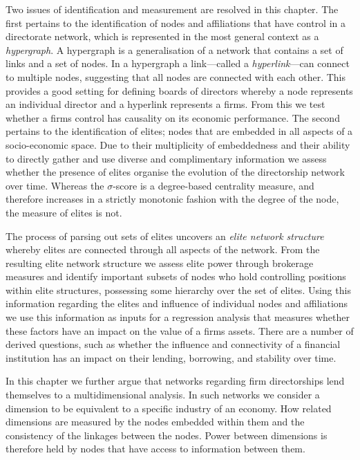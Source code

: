 Two issues of identification and measurement are resolved in this chapter. The first pertains to the identification of nodes and affiliations that have control in a directorate network, which is represented in the most general context as a \emph{hypergraph}. A hypergraph is a generalisation of a network that contains a set of links and a set of nodes. In a hypergraph a link---called a \emph{hyperlink}---can connect to multiple nodes, suggesting that all nodes are connected with each other. This provides a good setting for defining boards of directors whereby a node represents an individual director and a hyperlink represents a firms. From this we test whether a firms control has causality on its economic performance. The second pertains to the identification of elites; nodes that are embedded in all aspects of a socio-economic space. Due to their multiplicity of embeddedness and their ability to directly gather and use diverse and complimentary information we assess whether the presence of elites organise the evolution of the directorship network over time. Whereas the $\sigma$-score is a degree-based centrality measure, and therefore increases in a strictly monotonic fashion with the degree of the node, the measure of elites is not.

The process of parsing out sets of elites uncovers an \emph{elite network structure} whereby elites are connected through all aspects of the network. From the resulting elite network structure we assess elite power through brokerage measures and identify important subsets of nodes who hold controlling positions within elite structures, possessing some hierarchy over the set of elites. Using this information regarding the elites and influence of individual nodes and affiliations we use this information as inputs for a regression analysis that measures whether these factors have an impact on the value of a firms assets. There are a number of derived questions, such as whether the influence and connectivity of a financial institution has an impact on their lending, borrowing, and stability over time.

In this chapter we further argue that networks regarding firm directorships lend themselves to a multidimensional analysis. In such networks we consider a dimension to be equivalent to a specific industry of an economy. How related dimensions are measured by the nodes embedded within them and the consistency of the linkages between the nodes. Power between dimensions is therefore held by nodes that have access to information between them.

